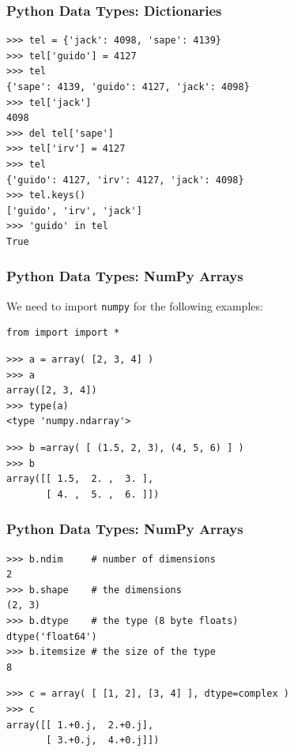 \documentclass[t,10pt,compress=false,usepdftitle=false]{beamer}
\begin{document}
\begin{frame}[fragile]
    \frametitle{Python Data Types: Dictionaries}
    \begin{myColorBox}{0.9}{}
\begin{verbatim}
>>> tel = {'jack': 4098, 'sape': 4139}
>>> tel['guido'] = 4127
>>> tel
{'sape': 4139, 'guido': 4127, 'jack': 4098}
>>> tel['jack']
4098
>>> del tel['sape']
>>> tel['irv'] = 4127
>>> tel
{'guido': 4127, 'irv': 4127, 'jack': 4098}
>>> tel.keys()
['guido', 'irv', 'jack']
>>> 'guido' in tel
True
\end{verbatim}
    \end{myColorBox}
\end{frame}


\begin{frame}[fragile]
    \frametitle{Python Data Types: NumPy Arrays}
We need to import \verb#numpy# for the following examples:
    \begin{myColorBox}{0.9}{}
\begin{verbatim}
from import import *
\end{verbatim}
    \end{myColorBox}
    \begin{myColorBox}{0.9}{}
\begin{verbatim}
>>> a = array( [2, 3, 4] )
>>> a
array([2, 3, 4])
>>> type(a) 
<type 'numpy.ndarray'>
\end{verbatim}
    \end{myColorBox}
    \pause
    \begin{myColorBox}{0.9}{}
\begin{verbatim}
>>> b =array( [ (1.5, 2, 3), (4, 5, 6) ] )
>>> b
array([[ 1.5,  2. ,  3. ],
       [ 4. ,  5. ,  6. ]])
\end{verbatim}
    \end{myColorBox}
\end{frame}

\begin{frame}[fragile]
    \frametitle{Python Data Types: NumPy Arrays}
    \begin{myColorBox}{0.9}{}
\begin{verbatim}
>>> b.ndim     # number of dimensions
2
>>> b.shape    # the dimensions
(2, 3)
>>> b.dtype    # the type (8 byte floats)
dtype('float64')
>>> b.itemsize # the size of the type
8
\end{verbatim}
    \end{myColorBox}
    \pause    
    \begin{myColorBox}{0.9}{}
\begin{verbatim}
>>> c = array( [ [1, 2], [3, 4] ], dtype=complex )
>>> c
array([[ 1.+0.j,  2.+0.j],
       [ 3.+0.j,  4.+0.j]])
\end{verbatim}
    \end{myColorBox}
\end{frame}
\end{document}
